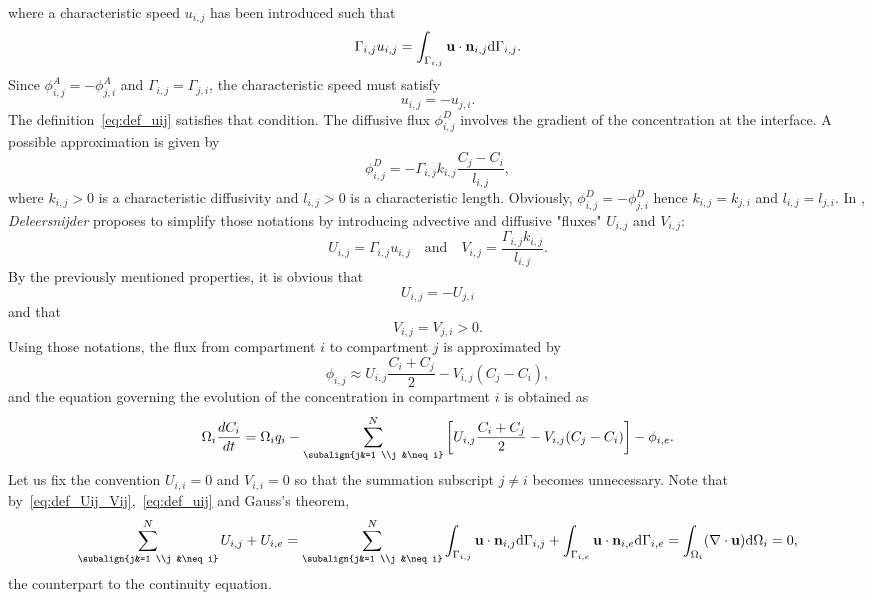 where a characteristic speed $u_{i,j}$ has been introduced such that
\begin{equation} \label{eq:def_uij}
	\Gamma_{i,j}u_{i,j} = \int_{\Gamma_{i,j}}\mathbf u \cdot \mathbf n_{i,j} \mathrm d\Gamma_{i,j}.
\end{equation}
Since $\phi_{i,j}^A = - \phi_{j,i}^A$ and $\Gamma_{i,j} = \Gamma_{j,i}$, the characteristic speed must satisfy
\begin{equation}
	u_{i,j} = - u_{j,i}.
\end{equation}
The definition~\eqref{eq:def_uij} satisfies that condition.
The diffusive flux $\phi_{i,j}^D$ involves the gradient of the concentration at the interface. A possible approximation is given by
\begin{equation}
	\phi_{i,j}^D = - \Gamma_{i,j} k_{i,j} \frac{C_j-C_i}{l_{i,j}},
\end{equation}
where $k_{i,j} > 0$ is a characteristic diffusivity and $l_{i,j} > 0$ is a characteristic length. Obviously, $\phi_{i,j}^D = -\phi_{j,i}^D$ hence $k_{i,j} = k_{j,i}$ and $l_{i,j} = l_{j,i}$. In \cite{deleersnijder2014compartment}, \textit{Deleersnijder} proposes to simplify those notations by introducing advective and diffusive "fluxes" $U_{i,j}$ and $V_{i,j}$:
\begin{equation} \label{eq:def_Uij_Vij}
	U_{i,j} = \Gamma_{i,j}u_{i,j} \quad \mbox{and} \quad V_{i,j} = \frac{\Gamma_{i,j}k_{i,j}}{l_{i,j}}.
\end{equation}
By the previously mentioned properties, it is obvious that 
\begin{equation} \label{eq:Uprop}
	U_{i,j} = -U_{j,i}
\end{equation} 
and that 
\begin{equation} \label{eq:Vprop}
	V_{i,j} = V_{j,i} > 0.
\end{equation}
Using those notations, the flux from compartment $i$ to compartment $j$ is approximated by
\begin{equation}
	\phi_{i,j} \approx U_{i,j} \frac{C_i + C_j}{2} - V_{i,j}(C_j - C_i),
\end{equation}
and the equation governing the evolution of the concentration in compartment $i$ is obtained as
\begin{equation} \label{eq:compartmentmodel}
	\Omega_i \frac{dC_i}{dt} = \Omega_i q_i - \sum_{\subalign{j&=1 \\j &\neq i}}^N \left[ U_{i,j}\frac{C_i + C_j}{2} - V_{i,j} (C_j-C_i)\right] - \phi_{i,e}.
\end{equation}
Let us fix the convention $U_{i,i} = 0$ and $V_{i,i} = 0$ so that the summation subscript $j \neq i$ becomes unnecessary.
Note that by~\eqref{eq:def_Uij_Vij},~\eqref{eq:def_uij} and Gauss's theorem,
\begin{equation} \label{eq:continuitycompartment}
	\sum_{\subalign{j&=1 \\j &\neq i}}^N U_{i,j} + U_{i,e} = \sum_{\subalign{j&=1 \\j &\neq i}}^N \int_{\Gamma_{i,j}}\b u \cdot \b n_{i,j} \rm d\Gamma_{i,j} + \int_{\Gamma_{i,e}}\b u \cdot \b n_{i,e} \rm d\Gamma_{i,e} = \int_{\Omega_{i}} (\nabla \cdot \b u) \rm d\Omega_{i} = 0,
\end{equation}
the counterpart to the continuity equation.